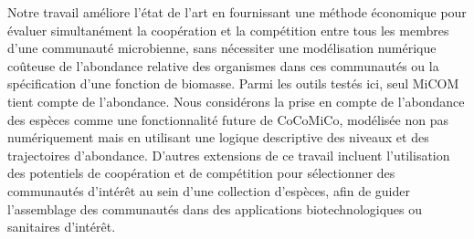 Notre travail améliore l'état de l'art en fournissant une méthode économique pour évaluer simultanément la coopération et la compétition entre tous les membres d'une communauté microbienne, sans nécessiter une modélisation numérique coûteuse de l'abondance relative des organismes dans ces communautés ou la spécification d'une fonction de biomasse. Parmi les outils testés ici, seul MiCOM tient compte de l'abondance. Nous considérons la prise en compte de l'abondance des espèces comme une fonctionnalité future de CoCoMiCo, modélisée non pas numériquement mais en utilisant une logique descriptive des niveaux et des trajectoires d'abondance. D'autres extensions de ce travail incluent l'utilisation des potentiels de coopération et de compétition pour sélectionner des communautés d'intérêt au sein d'une collection d'espèces, afin de guider l'assemblage des communautés dans des applications biotechnologiques ou sanitaires d'intérêt. 

